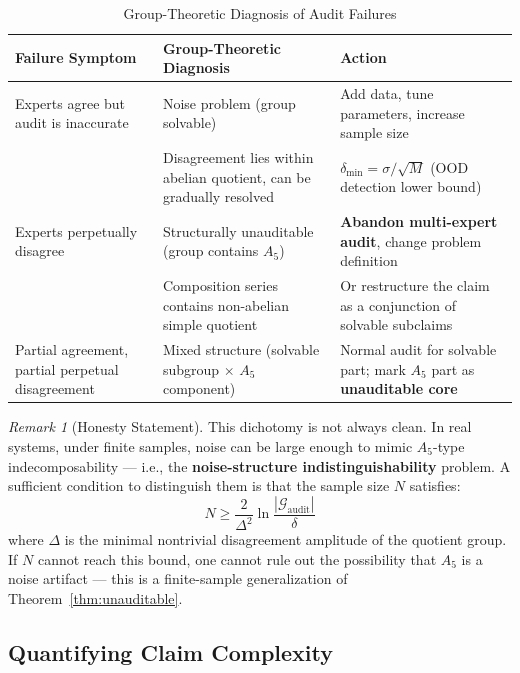 \documentclass[10pt,a4paper]{article}
\theoremstyle{remark}
\newtheorem{remark}[theorem]{Remark}
\begin{document}
\begin{table}[h]
\centering
\caption{Group-Theoretic Diagnosis of Audit Failures}
\small
\begin{tabular}{@{}p{3.2cm} p{4.5cm} p{4.2cm}@{}}
\toprule
\textbf{Failure Symptom} & \textbf{Group-Theoretic Diagnosis} & \textbf{Action} \\
\midrule
Experts agree but audit is inaccurate & Noise problem (group solvable) & Add data, tune parameters, increase sample size \\
 & Disagreement lies within abelian quotient, can be gradually resolved & $\delta_{\min} = \sigma/\sqrt{M}$ (OOD detection lower bound) \\
\midrule
Experts perpetually disagree & Structurally unauditable (group contains $A_5$) & \textbf{Abandon multi-expert audit}, change problem definition \\
 & Composition series contains non-abelian simple quotient & Or restructure the claim as a conjunction of solvable subclaims \\
\midrule
Partial agreement, partial perpetual disagreement & Mixed structure (solvable subgroup $\times$ $A_5$ component) & Normal audit for solvable part; mark $A_5$ part as \textbf{unauditable core} \\
\bottomrule
\end{tabular}
\end{table}

\begin{remark}[Honesty Statement]
This dichotomy is not always clean. In real systems, under finite samples, noise can be large enough to mimic $A_5$-type indecomposability --- i.e., the \textbf{noise-structure indistinguishability} problem. A sufficient condition to distinguish them is that the sample size $N$ satisfies:
\begin{equation}
N \ge \frac{2}{\Delta^2}\ln\frac{|\mathcal{G}_{\text{audit}}|}{\delta}
\end{equation}
where $\Delta$ is the minimal nontrivial disagreement amplitude of the quotient group. If $N$ cannot reach this bound, one cannot rule out the possibility that $A_5$ is a noise artifact --- this is a finite-sample generalization of Theorem~\ref{thm:unauditable}.
\end{remark}

\subsection{Quantifying Claim Complexity}
\end{document}
